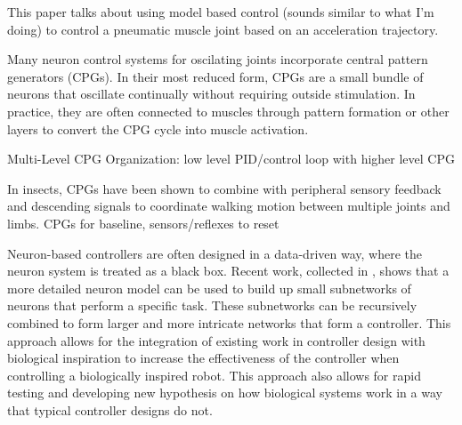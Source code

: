 This paper talks about using model based control (sounds similar to what I'm 
doing) to control a pneumatic muscle joint based on an acceleration trajectory.
\cite{Wang2013}




Many neuron control systems for oscilating joints incorporate central pattern
generators (CPGs). In their most reduced form, CPGs are a small bundle of
neurons that oscillate continually without requiring outside stimulation. In
practice, they are often connected to muscles through pattern formation or other
layers to convert the CPG cycle into muscle activation.
\cite{CPGReview}

Multi-Level CPG Organization: low level PID/control loop with higher level CPG
\cite{MultiLevelCPG}

In insects, CPGs have been shown to combine with peripheral sensory feedback and
descending signals to coordinate walking motion between multiple joints and
limbs.
CPGs for baseline, sensors/reflexes to reset \cite{SixLeggedWalking}


Neuron-based controllers are often designed in a data-driven way, where the
neuron system is treated as a black box. Recent work, collected in 
\cite{NickFunctionalSubnetwork}, shows that a more detailed neuron model can be
used to build up small subnetworks of neurons that perform a specific task.
These subnetworks can be recursively combined to form larger and more intricate
networks that form a controller. This approach allows for the integration of
existing work in controller design with biological inspiration to increase the
effectiveness of the controller when controlling a biologically inspired robot.
This approach also allows for rapid testing and developing new hypothesis on how
biological systems work in a way that typical controller designs do not.
